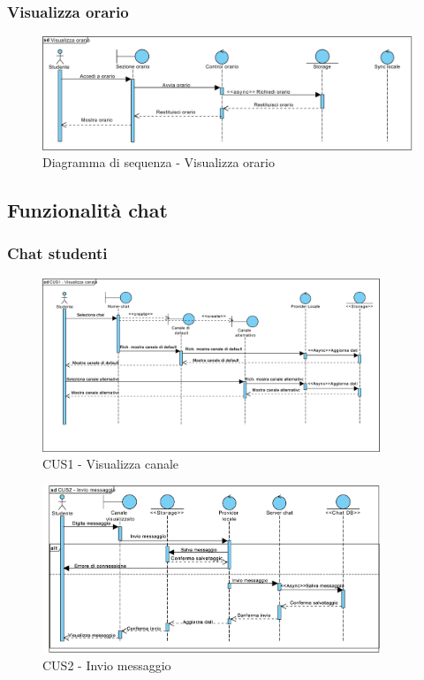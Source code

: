 \subsubsection{Visualizza orario} %

\begin{figure}[H]
	\centering
	\includegraphics[width=\textwidth]{imgs/gruppo2/sequence-orario-visualizza-orario.pdf}
	\caption{Diagramma di sequenza - Visualizza orario}
	\label{fig:sequence-orario-visualizza-orario}
\end{figure}


\subsection{Funzionalità chat}

\subsubsection{Chat studenti}
\begin{figure}
	\centering
	\includegraphics[width=0.9\textwidth]{imgs/gruppo6/sequence/CUS1_visualizza_canale.pdf}
	\caption{CUS1 - Visualizza canale}
	\label{fig:seq-cus1}
\end{figure}

\begin{figure}
	\centering
	\includegraphics[width=0.9\textwidth]{imgs/gruppo6/sequence/CUS2_invio_messaggio.pdf}
	\caption{CUS2 - Invio messaggio}
	\label{fig:seq-cus2}
\end{figure}


